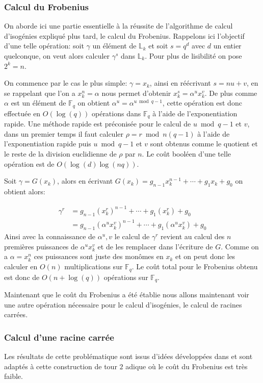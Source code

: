 \documentclass[10pt,a4paper]{book}
\theoremstyle{plain}
\theoremstyle{definition}
\theoremstyle{definition}
\theoremstyle{definition}
\theoremstyle{definition}
\theoremstyle{remark}
\theoremstyle{remark}
\begin{document}
\subsubsection*{Calcul du Frobenius}
On aborde ici une partie essentielle à la réussite de l'algorithme de calcul d'isogénies expliqué plus tard, le calcul du Frobenius. Rappelons ici l'objectif d'une telle opération: soit $\gamma $ un élément de $\mathbb{L}_k$ et soit $s=q^d$ avec $d$ un entier quelconque, on veut alors calculer $\gamma^s$ dans $\mathbb{L}_k$. Pour plus de lisibilité on pose $2^k=n$.


On commence par le cas le plus simple: $\gamma=x_k$, ainsi en réécrivant $s=nu+v$, en se rappelant que l'on a $x_k^n=\alpha $ nous permet d'obtenir $x_k^s=\alpha^ux_k^v$. De plus comme $\alpha$ est un élément de $\mathbb{F}_q$ on obtient $\alpha^u=\alpha^{u \bmod q-1}$, cette opération est donc effectuée en $O(\log(q))$ opérations dans $\mathbb{F}_q$ à l'aide de l'exponentiation rapide. Une méthode rapide est préconisée pour le calcul de $u \bmod q-1$ et $v$, dans un premier temps il faut calculer $\rho=r \bmod n(q-1)$ à l'aide de l'exponentiation rapide puis $u \bmod q-1$ et $v$ sont obtenus comme le quotient et le reste de la division euclidienne de $\rho$ par $n$. Le coût booléen d'une telle opération est de $O(\log(d)\log(nq))$.

Soit  $\gamma=G(x_k)$, alors en écrivant $G(x_k)=g_{n-1}x_k^{n-1}+ \cdots + g_1 x_k + g_0$ on obtient alors:

\begin{align*}
\gamma^r &= g_{n-1}(x_k^r)^{n-1}+ \cdots + g_1 (x_k^r) + g_0 \\
         &= g_{n-1}(\alpha^ux_k^v)^{n-1}+ \cdots + g_1 (\alpha^ux_k^v) + g_0
\end{align*}
Ainsi avec la connaissance de $\alpha^u,v$ le calcul de $\gamma^r$ revient au calcul des $n$ premières puissances de $\alpha^ux_k^v$ et de les remplacer dans l'écriture de $G$. Comme on a $\alpha=x_k^n$ ces puissances sont juste des monômes en $x_k$ et on peut donc les calculer en $O(n)$ multiplications sur $\mathbb{F}_q$. Le coût total pour le Frobenius obtenu est donc de $O(n+ \log(q))$ opérations sur $\mathbb{F}_q$.

Maintenant que le coût du Frobenius a été établie nous allons maintenant voir une autre opération nécessaire pour le calcul d'isogénies, le calcul de racines carrées.

\subsubsection*{Calcul d'une racine carrée}
Les résultats de cette problématique sont issus d'idées développées dans \cite{Doliskani-Schost14} et sont adaptés à cette construction de tour $2$ adique où le coût du Frobenius est très faible. 
\end{document}
